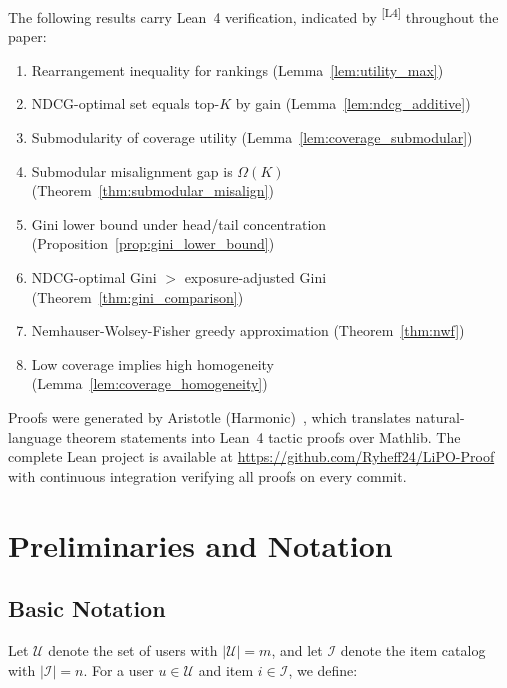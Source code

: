 \documentclass[11pt,a4paper]{article}
\theoremstyle{definition}
\theoremstyle{plain}
\theoremstyle{remark}
\newcommand{\leanmark}{\textsuperscript{\textcolor{green!50!black}{[L4]}}}
\begin{document}
The following results carry Lean~4 verification, indicated by \leanmark{} throughout the paper:
\begin{enumerate}[label=(\arabic*)]
    \item Rearrangement inequality for rankings (Lemma~\ref{lem:utility_max})
    \item NDCG-optimal set equals top-$K$ by gain (Lemma~\ref{lem:ndcg_additive})
    \item Submodularity of coverage utility (Lemma~\ref{lem:coverage_submodular})
    \item Submodular misalignment gap is $\Omega(K)$ (Theorem~\ref{thm:submodular_misalign})
    \item Gini lower bound under head/tail concentration (Proposition~\ref{prop:gini_lower_bound})
    \item NDCG-optimal Gini $>$ exposure-adjusted Gini (Theorem~\ref{thm:gini_comparison})
    \item Nemhauser-Wolsey-Fisher greedy approximation (Theorem~\ref{thm:nwf})
    \item Low coverage implies high homogeneity (Lemma~\ref{lem:coverage_homogeneity})
\end{enumerate}

Proofs were generated by Aristotle (Harmonic)~\cite{aristotle2025}, which translates natural-language theorem statements into Lean~4 tactic proofs over Mathlib. The complete Lean project is available at \url{https://github.com/Ryheff24/LiPO-Proof} with continuous integration verifying all proofs on every commit.

\section{Preliminaries and Notation}
\label{sec:preliminaries}

\subsection{Basic Notation}
\label{subsec:notation}

Let $\mathcal{U}$ denote the set of users with $|\mathcal{U}| = m$, and let $\mathcal{I}$ denote the item catalog with $|\mathcal{I}| = n$. For a user $u \in \mathcal{U}$ and item $i \in \mathcal{I}$, we define:
\end{document}
